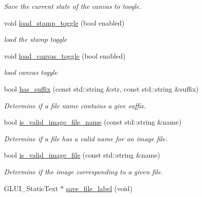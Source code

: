 \begin{DoxyCompactItemize}
\begin{DoxyCompactList}\small\item\em Save the current state of the canvas to toogle. \end{DoxyCompactList}\item 
void \hyperlink{classimage__tools_1_1IOManager_a6d8268c033e7aee661d3a3d7ae39f13d}{load\+\_\+stamp\+\_\+toggle} (bool enabled)\hypertarget{classimage__tools_1_1IOManager_a6d8268c033e7aee661d3a3d7ae39f13d}{}\label{classimage__tools_1_1IOManager_a6d8268c033e7aee661d3a3d7ae39f13d}

\begin{DoxyCompactList}\small\item\em load the stamp toggle \end{DoxyCompactList}\item 
void \hyperlink{classimage__tools_1_1IOManager_acefb393df8796d8d2f68a0aa7a67a1eb}{load\+\_\+canvas\+\_\+toggle} (bool enabled)\hypertarget{classimage__tools_1_1IOManager_acefb393df8796d8d2f68a0aa7a67a1eb}{}\label{classimage__tools_1_1IOManager_acefb393df8796d8d2f68a0aa7a67a1eb}

\begin{DoxyCompactList}\small\item\em load canvas toggle \end{DoxyCompactList}\item 
bool \hyperlink{classimage__tools_1_1IOManager_ab8176a3f8684b1da88565a84c752494e}{has\+\_\+suffix} (const std\+::string \&str, const std\+::string \&suffix)
\begin{DoxyCompactList}\small\item\em Determine if a file name contains a give suffix. \end{DoxyCompactList}\item 
bool \hyperlink{classimage__tools_1_1IOManager_ac65d32aa03ea74c4c81d135a4e56f6fd}{is\+\_\+valid\+\_\+image\+\_\+file\+\_\+name} (const std\+::string \&name)
\begin{DoxyCompactList}\small\item\em Determine if a file has a valid name for an image file. \end{DoxyCompactList}\item 
bool \hyperlink{classimage__tools_1_1IOManager_af5559c30af4a3b2d1a86c6081d840170}{is\+\_\+valid\+\_\+image\+\_\+file} (const std\+::string \&name)
\begin{DoxyCompactList}\small\item\em Determine if the image corresponding to a given file. \end{DoxyCompactList}\item 
G\+L\+U\+I\+\_\+\+Static\+Text $\ast$ \hyperlink{classimage__tools_1_1IOManager_a44ee0e7d400f05f1ebf992eb5faa6902}{save\+\_\+file\+\_\+label} (void)\hypertarget{classimage__tools_1_1IOManager_a44ee0e7d400f05f1ebf992eb5faa6902}{}\label{classimage__tools_1_1IOManager_a44ee0e7d400f05f1ebf992eb5faa6902}


\end{DoxyCompactItemize}
